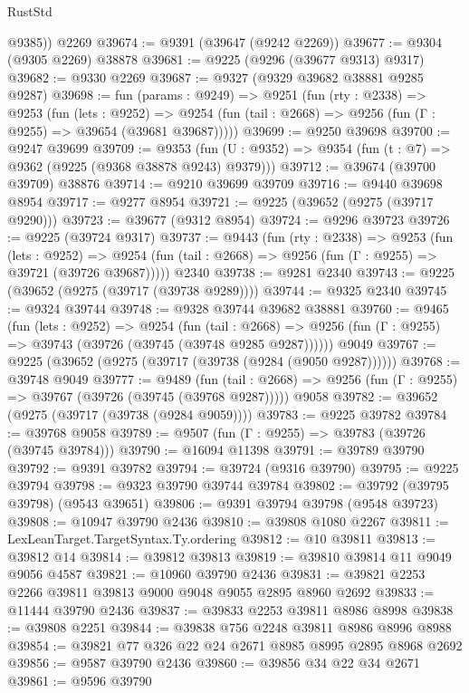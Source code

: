 \begin{lexlean}{RustStd}
\begin{coremodule}
        @9385))
    @2269
@39674 := @9391 (@39647 (@9242 @2269))
@39677 := @9304 (@9305 @2269) @38878
@39681 := @9225 (@9296 (@39677 @9313) @9317)
@39682 := @9330 @2269
@39687 := @9327 (@9329 @39682 @38881 @9285 @9287)
@39698 := fun (params : @9249) =>
  @9251
    (fun (rty : @2338) =>
    @9253
      (fun (lets : @9252) =>
      @9254 (fun (tail : @2668) => @9256 (fun (Γ : @9255) => @39654 (@39681 @39687)))))
@39699 := @9250 @39698
@39700 := @9247 @39699
@39709 := @9353
    (fun (U : @9352) => @9354 (fun (t : @7) => @9362 (@9225 (@9368 @38878 @9243) @9379)))
@39712 := @39674 (@39700 @39709) @38876
@39714 := @9210 @39699 @39709
@39716 := @9440 @39698 @8954
@39717 := @9277 @8954
@39721 := @9225 (@39652 (@9275 (@39717 @9290)))
@39723 := @39677 (@9312 @8954)
@39724 := @9296 @39723
@39726 := @9225 (@39724 @9317)
@39737 := @9443
    (fun (rty : @2338) =>
    @9253
      (fun (lets : @9252) =>
      @9254 (fun (tail : @2668) => @9256 (fun (Γ : @9255) => @39721 (@39726 @39687)))))
    @2340
@39738 := @9281 @2340
@39743 := @9225 (@39652 (@9275 (@39717 (@39738 @9289))))
@39744 := @9325 @2340
@39745 := @9324 @39744
@39748 := @9328 @39744 @39682 @38881
@39760 := @9465
    (fun (lets : @9252) =>
    @9254
      (fun (tail : @2668) =>
      @9256 (fun (Γ : @9255) => @39743 (@39726 (@39745 (@39748 @9285 @9287))))))
    @9049
@39767 := @9225 (@39652 (@9275 (@39717 (@39738 (@9284 (@9050 @9287))))))
@39768 := @39748 @9049
@39777 := @9489
    (fun (tail : @2668) => @9256 (fun (Γ : @9255) => @39767 (@39726 (@39745 (@39768 @9287)))))
    @9058
@39782 := @39652 (@9275 (@39717 (@39738 (@9284 @9059))))
@39783 := @9225 @39782
@39784 := @39768 @9058
@39789 := @9507 (fun (Γ : @9255) => @39783 (@39726 (@39745 @39784)))
@39790 := @16094 @11398
@39791 := @39789 @39790
@39792 := @9391 @39782
@39794 := @39724 (@9316 @39790)
@39795 := @9225 @39794
@39798 := @9323 @39790 @39744 @39784
@39802 := @39792 (@39795 @39798) (@9543 @39651)
@39806 := @9391 @39794 @39798 (@9548 @39723)
@39808 := @10947 @39790 @2436
@39810 := @39808 @1080 @2267
@39811 := LexLeanTarget.TargetSyntax.Ty.ordering
@39812 := @10 @39811
@39813 := @39812 @14
@39814 := @39812 @39813
@39819 := @39810 @39814 @11 @9049 @9056 @4587
@39821 := @10960 @39790 @2436
@39831 := @39821 @2253 @2266 @39811 @39813 @9000 @9048 @9055 @2895 @8960 @2692
@39833 := @11444 @39790 @2436
@39837 := @39833 @2253 @39811 @8986 @8998
@39838 := @39808 @2251
@39844 := @39838 @756 @2248 @39811 @8986 @8996 @8988
@39854 := @39821 @77 @326 @22 @24 @2671 @8985 @8995 @2895 @8968 @2692
@39856 := @9587 @39790 @2436
@39860 := @39856 @34 @22 @34 @2671
@39861 := @9596 @39790

\end{coremodule}
\end{lexlean}
